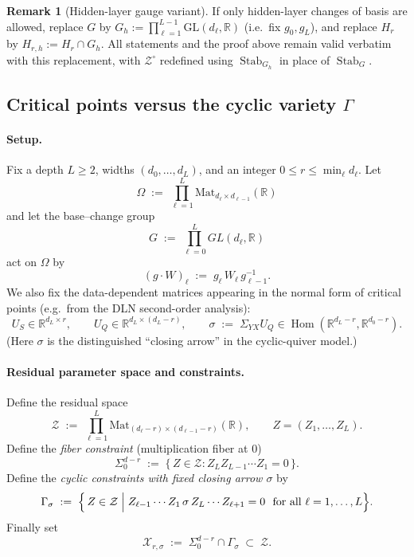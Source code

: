 \documentclass{article}
\newcommand{\Hom}{\operatorname{Hom}}
\newcommand{\R}{\mathbb{R}}
\newcommand{\Mat}{\mathrm{Mat}}
\theoremstyle{definition}
\newtheorem{remark}[theorem]{Remark}
\begin{document}
\begin{remark}[Hidden-layer gauge variant]
If only hidden-layer changes of basis are allowed, replace $G$ by $G_h := \prod_{\ell=1}^{L-1} \mathrm{GL}(d_\ell, \mathbb{R})$ (i.e.\ fix $g_0, g_L$), and replace $H_r$ by $H_{r,h} := H_r \cap G_h$. All statements and the proof above remain valid verbatim with this replacement, with $\mathcal{Z}^{\circ}$ redefined using $\operatorname{Stab}_{G_h}$ in place of $\operatorname{Stab}_G$.
\end{remark}

\subsection{Critical points versus the cyclic variety $\Gamma$}

\paragraph{Setup.}
Fix a depth $L\ge 2$, widths $(d_0,\dots,d_L)$, and an integer $0\le r\le \min_\ell d_\ell$.
Let
\[
\Omega \;:=\; \prod_{\ell=1}^L \Mat_{d_\ell\times d_{\ell-1}}(\R)
\]
and let the base--change group
\[
G \;:=\; \prod_{\ell=0}^L GL(d_\ell,\R)
\]
act on $\Omega$ by
\begin{equation}\label{eq:gauge-action-crit}
(g\cdot W)_\ell \;:=\; g_\ell\, W_\ell\, g_{\ell-1}^{-1}.
\end{equation}
We also fix the data-dependent matrices appearing in the normal form of critical points (e.g.\ from the DLN second-order analysis):
\[
U_S\in \R^{d_L\times r},\qquad U_Q\in \R^{d_L\times(d_L-r)},\qquad
\sigma \;:=\; \Sigma_{YX}U_Q \in \Hom(\R^{d_L-r},\R^{d_0-r}).
\]
(Here $\sigma$ is the distinguished ``closing arrow'' in the cyclic-quiver model.)

\paragraph{Residual parameter space and constraints.}
Define the residual space
\[
\mathcal Z \;:=\; \prod_{\ell=1}^L \Mat_{(d_\ell-r)\times(d_{\ell-1}-r)}(\R),
\qquad Z=(Z_1,\dots,Z_L).
\]
Define the \emph{fiber constraint} (multiplication fiber at $0$)
\begin{equation}\label{eq:Sigma0-dr}
\Sigma^{d-r}_0 \;:=\; \{\,Z\in \mathcal Z : Z_L Z_{L-1}\cdots Z_1 = 0\,\}.
\end{equation}
Define the \emph{cyclic constraints with fixed closing arrow $\sigma$} by
\begin{equation}\label{eq:Gamma-sigma}
\Gamma_\sigma \;:=\;
\Bigl\{\,Z\in\mathcal Z \;\Big|\;
Z_{\ell-1}\cdots Z_1\,\sigma\, Z_L\cdots Z_{\ell+1}=0\ \text{ for all }\ell=1,\dots,L
\Bigr\}.
\end{equation}
Finally set
\begin{equation}\label{eq:X-def}
\mathcal X_{r,\sigma} \;:=\; \Sigma^{d-r}_0 \cap \Gamma_\sigma \;\subset\; \mathcal Z.
\end{equation}
\end{document}
